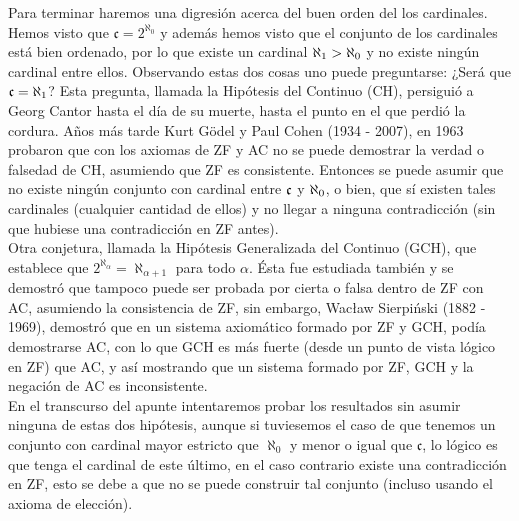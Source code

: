 \documentclass[12pt,a4paper]{book}
\begin{document}
Para terminar haremos una digresión acerca del buen orden del los cardinales. Hemos visto que $ \mathfrak{c} = 2^{\aleph_0}$ y además hemos visto que el conjunto de los cardinales está bien ordenado, por lo que existe un cardinal $\aleph_1 > \a0$ y no existe ningún cardinal entre ellos. Observando estas dos cosas uno puede preguntarse: ¿Será que $ \mathfrak{c} = \aleph_1$? Esta pregunta, llamada la Hipótesis del Continuo (CH), persiguió a Georg Cantor hasta el día de su muerte, hasta el punto en el que perdió la cordura. Años más tarde Kurt Gödel y Paul Cohen (1934 - 2007), en 1963 probaron que con los axiomas de ZF y AC no se puede demostrar la verdad o falsedad de CH, asumiendo que ZF es consistente. Entonces se puede asumir que no existe ningún conjunto con cardinal entre $\mathfrak{c}$ y $\a0$, o bien, que sí existen tales cardinales (cualquier cantidad de ellos) y no llegar a ninguna contradicción (sin que hubiese una contradicción en ZF antes).\\
Otra conjetura, llamada la Hipótesis Generalizada del Continuo (GCH), que establece que $2^{\aleph_{\alpha}} = \aleph_{\alpha+1}$ para todo $\alpha$. Ésta fue estudiada también y se demostró que tampoco puede ser probada por cierta o falsa dentro de ZF con AC, asumiendo la consistencia de ZF, sin embargo, Wacław Sierpiński (1882 - 1969), demostró que en un sistema axiomático formado por ZF y GCH, podía demostrarse AC, con lo que GCH es más fuerte (desde un punto de vista lógico en ZF) que AC, y así mostrando que un sistema formado por ZF, GCH y la negación de AC es inconsistente.\\
En el transcurso del apunte intentaremos probar los resultados sin asumir ninguna de estas dos hipótesis, aunque si tuviesemos el caso de que tenemos un conjunto con cardinal mayor estricto que $\aleph_0$ y menor o igual que $\mathfrak{c}$, lo lógico es que tenga el cardinal de este último, en el caso contrario existe una contradicción en ZF, esto se debe a que no se puede construir tal conjunto (incluso usando el axioma de elección).\\

\ifx\isEmbedded\undefined
\end{document}
